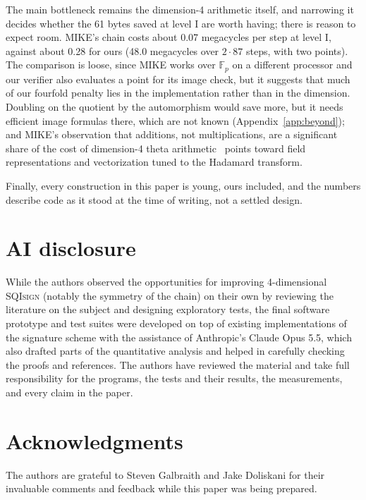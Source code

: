 \documentclass[version=preprint]{iacrcc}
\newif\ifanon
\newcommand{\SQIsign}{SQI{\textsc{sign}}}
\begin{document}
    The main bottleneck remains the dimension-4 arithmetic itself, and
    narrowing it decides whether the 61 bytes saved at level I are worth
    having; there is reason to expect room. MIKE's chain costs about 0.07 megacycles per step
    at level I, against about 0.28 for ours (48.0 megacycles over $2 \cdot
    87$ steps, with two points). The comparison is loose, since MIKE works over $\mathbb{F}_p$
    on a different processor and our verifier also evaluates a point for its
    image check, but it suggests that much of our fourfold penalty lies in the
    implementation rather than in the dimension. Doubling on the quotient by
    the automorphism would save more, but it needs efficient image formulas
    there, which are not known (Appendix~\ref{app:beyond}); and MIKE's
    observation that additions, not
    multiplications, are a significant share of the cost of dimension-4 theta
    arithmetic~\cite[Section 6]{BDD+26} points toward field representations
    and vectorization tuned to the Hadamard transform.

    Finally, every construction in this paper is young, ours included, and the
    numbers describe code as it stood at the time of writing, not a settled design.

\section*{AI disclosure}
    While the authors observed the opportunities for improving 4-dimensional {\SQIsign} (notably the symmetry of the chain) on their own by reviewing the literature on the subject and designing exploratory tests, the final software prototype and test suites were developed on top of existing implementations of the signature scheme with the assistance of Anthropic's Claude Opus 5.5, which also drafted parts of the quantitative analysis and helped in carefully checking the proofs and references.
    The authors have reviewed the material and take full responsibility for the programs, the tests and their results, the measurements, and every claim in the paper.

    \ifanon\else
    \section*{Acknowledgments}
    The authors are grateful to Steven Galbraith and Jake Doliskani for their invaluable comments and feedback while this paper was being prepared.
    \fi
\end{document}
